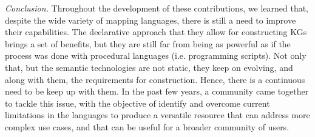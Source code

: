 \begin{itemize}
    \textit{Conclusion.} Throughout the development of these contributions, we learned that, despite the wide variety of mapping languages, there is still a need to improve their capabilities. The declarative approach that they allow for constructing KGs brings a set of benefits, but they are still far from being as powerful as if the process was done with procedural languages (i.e. programming scripts). Not only that, but the semantic technologies are not static, they keep on evolving, and along with them, the requirements for construction. Hence, there is a continuous need to be keep up with them. In the past few years, a community came together to tackle this issue, with the objective of identify and overcome current limitations in the languages to produce a versatile resource that can address more complex use cases, and that can be useful for a broader community of users. %
\end{itemize}





